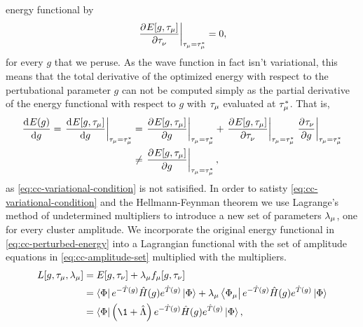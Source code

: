             energy functional by
            \begin{align}
                \left.
                \dpd[]{E[g, \clustamp_{\mu}]}{\clustamp_{\nu}}
                \right\rvert_{\clustamp_{\mu} = \clustamp^{*}_{\mu}}
                = 0,
                \label{eq:cc-variational-condition}
            \end{align}
            for every $g$ that we peruse.
            As the wave function in fact isn't variational, this means that the
            total derivative of the optimized energy with respect to the
            pertubational parameter $g$ can not be computed simply as the
            partial derivative of the energy functional with respect to $g$ with
            $\tau_{\mu}$ evaluated at $\tau^{*}_{\mu}$.
            That is,
            \begin{align}
                \dod[]{E(g)}{g}
                =
                \left.
                \dod[]{E[g, \clustamp_{\mu}]}{g}
                \right\rvert_{\clustamp_{\mu} = \clustamp^{*}_{\mu}}
                &=
                \left.
                \dpd[]{E[g, \clustamp_{\mu}]}{g}
                \right\rvert_{\clustamp_{\mu} = \clustamp^{*}_{\mu}}
                +
                \left.
                \dpd[]{E[g, \clustamp_{\mu}]}{\clustamp_{\nu}}
                \right\rvert_{\clustamp_{\mu} = \clustamp^{*}_{\mu}}
                \left.
                \dpd[]{\clustamp_{\nu}}{g}
                \right\rvert_{\clustamp_{\mu} = \clustamp^{*}_{\mu}}
                \\
                &\neq
                \left.
                \dpd[]{E[g, \clustamp_{\mu}]}{g}
                \right\rvert_{\clustamp_{\mu} = \clustamp^{*}_{\mu}},
            \end{align}
            as \autoref{eq:cc-variational-condition} is not satisified.
            In order to satisty \autoref{eq:cc-variational-condition} and the
            Hellmann-Feynman theorem we use Lagrange's method of undetermined
            multipliers to introduce a new set of parameters $\lambda_{\mu}$,
            one for every cluster amplitude.
            We incorporate the original energy functional in
            \autoref{eq:cc-perturbed-energy} into a Lagrangian functional with
            the set of amplitude equations in \autoref{eq:cc-amplitude-set}
            multiplied with the multipliers.
            \begin{align}
                L[g, \clustamp_{\mu}, \clustlamp_{\mu}]
                &= E[g, \clustamp_{\nu}]
                + \clustlamp_{\mu} f_{\mu}[g, \clustamp_{\nu}]
                \\
                &=
                \bra{\slat}e^{-\clust(g)}\hamil(g) e^{\clust(g)}\ket{\slat}
                +
                \clustlamp_{\mu}
                \bra{\slat_{\mu}}
                e^{-\clust(g)}\hamil(g) e^{\clust(g)}\ket{\slat}
                \\
                &=
                \bra{\slat}
                \para{\1 + \clustl}
                e^{-\clust(g)}\hamil(g) e^{\clust(g)}
                \ket{\slat},
                \label{eq:cc-perturbed-lagrangian}
            \end{align}
